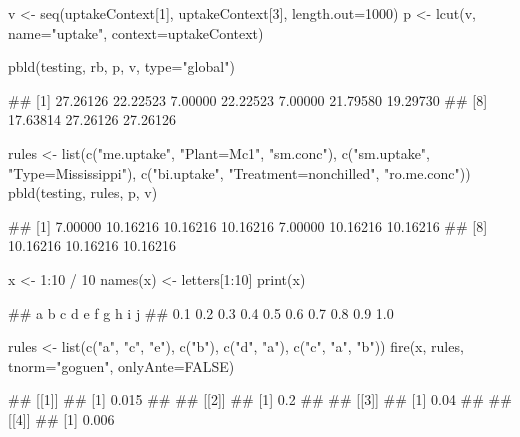 \documentclass{article}\usepackage[]{graphicx}\usepackage[]{color}
\begin{document}
\begin{Schunk}
% --begin: "pbld5"
\begin{Sinput}
v <- seq(uptakeContext[1], uptakeContext[3], length.out=1000)
p <- lcut(v, name="uptake", context=uptakeContext)
\end{Sinput}
%
% --end: "pbld5"
\end{Schunk}

\begin{Schunk}
% --begin: "pbld6"
\begin{Sinput}
pbld(testing, rb, p, v, type="global")
\end{Sinput}
\begin{Soutput}
##  [1] 27.26126 22.22523  7.00000 22.22523  7.00000 21.79580 19.29730
##  [8] 17.63814 27.26126 27.26126
\end{Soutput}
%
% --end: "pbld6"
\end{Schunk}

\begin{Schunk}
% --begin: "pbld_custom"
\begin{Sinput}
rules <- list(c("me.uptake", "Plant=Mc1", "sm.conc"),
              c("sm.uptake", "Type=Mississippi"),
              c("bi.uptake", "Treatment=nonchilled", "ro.me.conc"))
pbld(testing, rules, p, v)
\end{Sinput}
\begin{Soutput}
##  [1]  7.00000 10.16216 10.16216 10.16216  7.00000 10.16216 10.16216
##  [8] 10.16216 10.16216 10.16216
\end{Soutput}
%
% --end: "pbld_custom"
\end{Schunk}

\begin{Schunk}
% --begin: "fire"
\begin{Sinput}
x <- 1:10 / 10
names(x) <- letters[1:10]
print(x)
\end{Sinput}
\begin{Soutput}
##   a   b   c   d   e   f   g   h   i   j 
## 0.1 0.2 0.3 0.4 0.5 0.6 0.7 0.8 0.9 1.0
\end{Soutput}
\begin{Sinput}
rules <- list(c("a", "c", "e"),
              c("b"),
              c("d", "a"),
              c("c", "a", "b"))
fire(x, rules, tnorm="goguen", onlyAnte=FALSE)
\end{Sinput}
\begin{Soutput}
## [[1]]
## [1] 0.015
## 
## [[2]]
## [1] 0.2
## 
## [[3]]
## [1] 0.04
## 
## [[4]]
## [1] 0.006
\end{Soutput}
%
% --end: "fire"
\end{Schunk}
\end{document}
